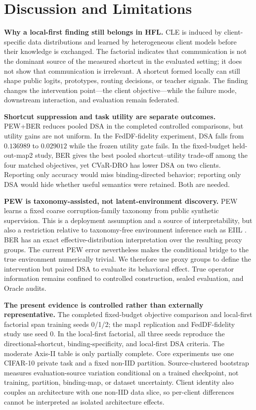 \section{Discussion and Limitations}

\textbf{Why a local-first finding still belongs in HFL.}
CLE is induced by client-specific data distributions and learned by heterogeneous client models before their knowledge is exchanged. The factorial indicates that communication is not the dominant source of the measured shortcut in the evaluated setting; it does not show that communication is irrelevant. A shortcut formed locally can still shape public logits, prototypes, routing decisions, or teacher signals. The finding changes the intervention point---the client objective---while the failure mode, downstream interaction, and evaluation remain federated.

\textbf{Shortcut suppression and task utility are separate outcomes.}
PEW+BER reduces pooled DSA in the completed controlled comparisons, but utility gains are not uniform. In the FedDF-fidelity experiment, DSA falls from \(0.136989\) to \(0.029012\) while the frozen utility gate fails. In the fixed-budget held-out-map2 study, BER gives the best pooled shortcut--utility trade-off among the four matched objectives, yet CVaR-DRO has lower DSA on two clients. Reporting only accuracy would miss binding-directed behavior; reporting only DSA would hide whether useful semantics were retained. Both are needed.

\textbf{PEW is taxonomy-assisted, not latent-environment discovery.}
PEW learns a fixed coarse corruption-family taxonomy from public synthetic supervision. This is a deployment assumption and a source of interpretability, but also a restriction relative to taxonomy-free environment inference such as EIIL \citep{creager2021eiil}. BER has an exact effective-distribution interpretation over the resulting proxy groups. The current PEW error nevertheless makes the conditional bridge to the true environment numerically trivial. We therefore use proxy groups to define the intervention but paired DSA to evaluate its behavioral effect. True operator information remains confined to controlled construction, sealed evaluation, and Oracle audits.

\textbf{The present evidence is controlled rather than externally representative.}
The completed fixed-budget objective comparison and local-first factorial span training seeds 0/1/2; the map1 replication and FedDF-fidelity study use seed 0. In the local-first factorial, all three seeds reproduce the directional-shortcut, binding-specificity, and local-first DSA criteria. The moderate Axis-II table is only partially complete. Core experiments use one CIFAR-10 private task and a fixed non-IID partition. Source-clustered bootstrap measures evaluation-source variation conditional on a trained checkpoint, not training, partition, binding-map, or dataset uncertainty. Client identity also couples an architecture with one non-IID data slice, so per-client differences cannot be interpreted as isolated architecture effects.

